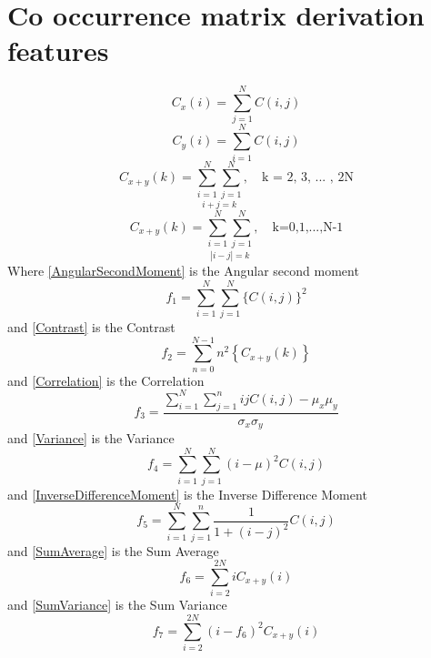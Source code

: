 \chapter{Co occurrence matrix derivation features}
\label{derivationfeatures}
\begin{equation}\label{Cxi}
  C_x(i) = \sum_{j=1}^{N}C(i,j)
\end{equation}
\begin{equation}\label{Cyi}
  C_y(i) = \sum_{i=1}^{N}C(i,j)
\end{equation}
\begin{equation}\label{Cxplusy}
  C_{x+y}(k) = \underset{i+j=k}{\sum_{i=1}^{N}\sum_{j=1}^{N}}, \quad \text{k = 2, 3, ... , 2N}
\end{equation}
\begin{equation}\label{Cxminusy}
  C_{x+y}(k) = \underset{|i-j|=k}{\sum_{i=1}^{N}\sum_{j=1}^{N}}, \quad \text{k=0,1,...,N-1}
\end{equation}
Where \ref{AngularSecondMoment} is the Angular second moment
\begin{equation}\label{AngularSecondMoment}
  f_1 = \sum_{i=1}^{N}\sum_{j=1}^{N}\{C(i,j)\}^2
\end{equation}
and \ref{Contrast} is the Contrast
\begin{equation}\label{Contrast}
  f_2 = \sum_{n=0}^{N-1} n^2 \left\{C_{x+y}(k)\right\}
\end{equation}
and \ref{Correlation} is the Correlation
\begin{equation}\label{Correlation}
  f_3 = \frac{\sum_{i=1}^{N}\sum_{j=1}^{n} i j C(i,j) - \mu_x \mu_y}{\sigma_x\sigma_y}
\end{equation}
and \ref{Variance} is the Variance
\begin{equation}\label{Variance}
  f_4 = \sum_{i=1}^{N}\sum_{j=1}^{N}(i-\mu)^2 C(i,j)
\end{equation}
and \ref{InverseDifferenceMoment} is the Inverse Difference Moment
\begin{equation}\label{InverseDifferenceMoment}
  f_5 = \sum_{i=1}^{N}\sum_{j=1}^{n} \frac{1}{1+(i-j)^2} C(i,j)
\end{equation}
and \ref{SumAverage} is the Sum Average
\begin{equation}\label{SumAverage}
  f_6 = \sum_{i=2}^{2N} i C_{x+y}(i)
\end{equation}
and \ref{SumVariance} is the Sum Variance
\begin{equation}\label{SumVariance}
  f_7 = \sum_{i=2}^{2N} (i - f_6)^2 C_{x+y}(i)
\end{equation}

